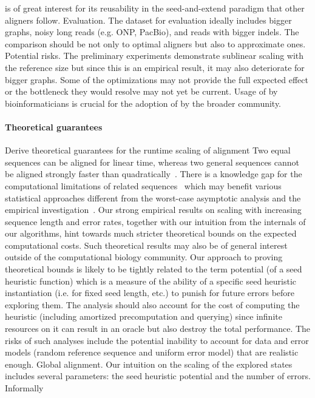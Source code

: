 is of great interest for its reusability in the seed-and-extend paradigm that
other aligners follow. Evaluation. The dataset for evaluation ideally includes
bigger graphs, noisy long reads (e.g. ONP, PacBio), and reads with bigger
indels. The comparison should be not only to optimal aligners but also to
approximate ones. Potential risks. The preliminary experiments demonstrate
sublinear scaling with the reference size but since this is an empirical result,
it may also deteriorate for bigger graphs. Some of the optimizations may not
provide the full expected effect or the bottleneck they would resolve may not
yet be current. Usage of \astarix by bioinformaticians is crucial for the
adoption of \astarix by the broader community.

\paragraph{Theoretical guarantees}
Derive theoretical guarantees for the runtime scaling of \A alignment Two equal
sequences can be aligned for linear time, whereas two general sequences cannot
be aligned strongly faster than quadratically~. There is a
knowledge gap for the computational limitations of related
sequences~\citep{medvedev2022limitations} which may benefit various statistical
approaches different from the worst-case asymptotic analysis and the empirical
investigation~\citep{medvedev2022theoretical}. Our strong empirical results on
scaling with increasing sequence length and error rates, together with our
intuition from the internals of our \A algorithms, hint towards much stricter
theoretical bounds on the expected computational costs. Such theoretical results
may also be of general interest outside of the computational biology community.
Our approach to proving theoretical bounds is likely to be tightly related to
the term potential (of a seed heuristic function) which is a measure of the
ability of a specific seed heuristic instantiation (i.e. for fixed seed length,
etc.) to punish for future errors before exploring them. The analysis should
also account for the cost of computing the heuristic (including amortized
precomputation and querying) since infinite resources on it can result in an
oracle but also destroy the total performance. The risks of such analyses
include the potential inability to account for data and error models (random
reference sequence and uniform error model) that are realistic enough. Global
alignment. Our intuition on the scaling of the explored states includes several
parameters: the seed heuristic potential and the number of errors. Informally
